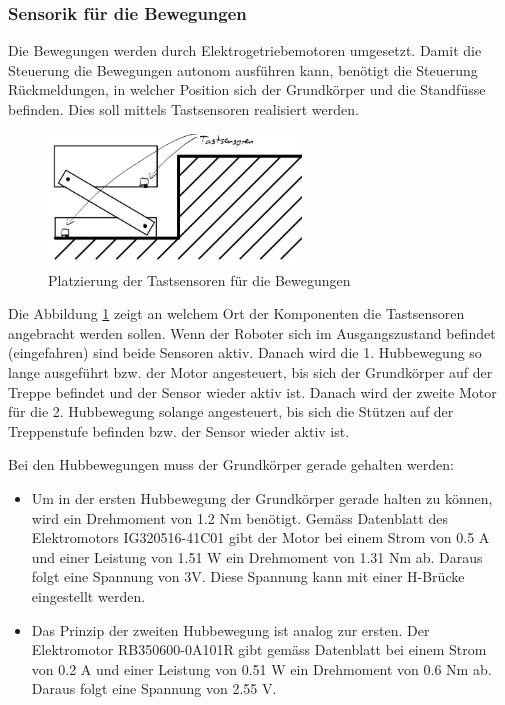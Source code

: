 \subsubsection{Sensorik für die Bewegungen}
Die Bewegungen werden durch Elektrogetriebemotoren umgesetzt. Damit die Steuerung die Bewegungen autonom ausführen kann, benötigt die Steuerung Rückmeldungen, in welcher Position sich der Grundkörper und die Standfüsse befinden. Dies soll mittels Tastsensoren realisiert werden.

\begin{figure}[h]
  \includegraphics[width=0.6\textwidth]{img/Treppensteigen/Sensoren_Treppensteigen1.png}
  \centering
  \caption{Platzierung der Tastsensoren für die Bewegungen}
  \label{fig2}
\end{figure}

Die Abbildung \ref{fig2} zeigt an welchem Ort der Komponenten die Tastsensoren angebracht werden sollen. Wenn der Roboter sich im Ausgangszustand befindet (eingefahren) sind beide Sensoren aktiv. Danach wird die 1. Hubbewegung so lange ausgeführt bzw. der Motor angesteuert, bis sich der Grundkörper auf der Treppe befindet und der Sensor wieder aktiv ist. Danach wird der zweite Motor für die 2. Hubbewegung solange angesteuert, bis sich die Stützen auf der Treppenstufe befinden bzw. der Sensor wieder aktiv ist.

Bei den Hubbewegungen muss der Grundkörper gerade gehalten werden:
\begin{itemize}
    \item Um in der ersten Hubbewegung der Grundkörper gerade halten zu können, wird ein Drehmoment von 1.2 Nm benötigt. Gemäss Datenblatt des Elektromotors IG320516-41C01 gibt der Motor bei einem Strom von 0.5 A und einer Leistung von 1.51 W ein Drehmoment von 1.31 Nm ab. Daraus folgt eine Spannung von 3V. Diese Spannung kann mit einer H-Brücke eingestellt werden.
    \item Das Prinzip der zweiten Hubbewegung ist analog zur ersten. Der Elektromotor RB350600-0A101R gibt gemäss Datenblatt bei einem Strom von 0.2 A und einer Leistung von 0.51 W ein Drehmoment von 0.6 Nm ab. Daraus folgt eine Spannung von 2.55 V.
 \end{itemize}


